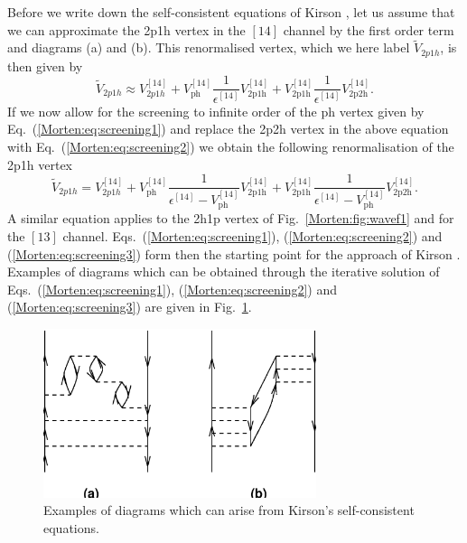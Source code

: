 Before we write down the self-consistent equations
of Kirson \cite{Morten:kirson74}, let us assume that we
can approximate the 2p1h vertex in the $[14]$ channel 
by the first order term and diagrams (a) and (b).
This renormalised vertex, which we here label
$\tilde{V}_{2p1h}$, is then given by
\begin{equation}
     \tilde{V}_{2p1h}\approx {V}_{2p1h}^{[14]}
     +V_{\mathrm{ph}}^{[14]}
     \frac{1}{\epsilon^{[14]}}
     V_{\mathrm{2p1h}}^{[14]}+
     V_{\mathrm{2p1h}}^{[14]}
     \frac{1}{\epsilon^{[14]}}
     V_{\mathrm{2p2h}}^{[14]}.
     \label{Morten:eq:2p1hsecondorder}     
\end{equation} 
If we now allow for the screening to infinite order
of the ph vertex given by Eq.~(\ref{Morten:eq:screening1})
and replace the 2p2h vertex in the above equation
with Eq.~(\ref{Morten:eq:screening2}) we obtain the following
renormalisation of the 2p1h vertex
\begin{equation}
     \tilde{V}_{2p1h}= {V}_{2p1h}^{[14]}
     +V_{\mathrm{ph}}^{[14]}
     \frac{1}
     {\epsilon^{[14]}-V_{\mathrm{ph}}^{[14]}}
     V_{\mathrm{2p1h}}^{[14]}+
     V_{\mathrm{2p1h}}^{[14]}
     \frac{1}
     {\epsilon^{[14]}-V_{\mathrm{ph}}^{[14]}}
     V_{\mathrm{2p2h}}^{[14]}.
     \label{Morten:eq:screening3}
\end{equation} 
A similar equation applies to the 2h1p vertex of
Fig.~\ref{Morten:fig:wavef1} and
for the $[13]$ channel. Eqs.~(\ref{Morten:eq:screening1}),
(\ref{Morten:eq:screening2}) and (\ref{Morten:eq:screening3}) form then
the starting point for the approach of Kirson \cite{Morten:kirson74}.
Examples of diagrams which can be obtained through the 
iterative solution of Eqs.~(\ref{Morten:eq:screening1}),
(\ref{Morten:eq:screening2}) and (\ref{Morten:eq:screening3})
are given in Fig.~\ref{Morten:fig:kirsoniterate}.
\begin{figure}[tbh]
	\begin{center}
      	\includegraphics[width=8cm]{kirson.eps}
	\end{center}
       \caption{Examples of diagrams which can arise from Kirson's
                self-consistent equations.}
       \label{Morten:fig:kirsoniterate}
\end{figure}

